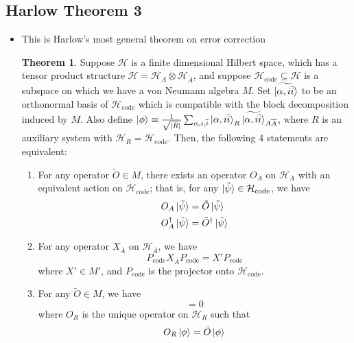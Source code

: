 \documentclass[12pt,a4paper]{article}
\numberwithin{equation}{section}
\newcommand{\Pc}{P_{\text{code}}}
\newcommand{\Hcode}{\mathcal{H}_{\text{code}}}
\newcommand{\ol}[1]{\overline{#1}}
\theoremstyle{definition}
\theoremstyle{theorem}
\newtheorem{theorem}{Theorem}[section]
\theoremstyle{example}
\begin{document}
	\subsection{Harlow Theorem 3}
	\begin{itemize}
		\item This is Harlow's most general theorem on error correction
		\begin{theorem}
			Suppose $\mathcal{H}$ is a finite dimensional Hilbert space, which has a tensor product structure $\mathcal{H}=\mathcal{H}_{A}\otimes\mathcal{H}_{\ol{A}}$, and suppose $\Hcode\subseteq\mathcal{H}$ is a subspace on which we have a von Neumann algebra $M$. Set $\ket{\widetilde{\alpha,i\ol{i}}}$ to be an orthonormal basis of $\Hcode$ which is compatible with the block decomposition induced by $M$. Also define $\ket{\phi}\equiv\frac{1}{\sqrt{|R|}}\sum_{\alpha,i,\ol{i}}\ket{\alpha,i\ol{i}}_{R}\ket{\widetilde{\alpha, i\ol{i}}}_{A\ol{A}}$, where $R$ is an auxiliary system with $\mathcal{H}_{R}=\Hcode$. Then, the following 4 statements are equivalent:
			\begin{enumerate}
				\item For any operator $\tilde{O}\in M$, there exists an operator $O_{A}$ on $\mathcal{H}_{A}$ with an equivalent action on $\Hcode$; that is, for any $\ket{\tilde{\psi}}\in\Hcode$, we have
				\begin{equation}
					\begin{aligned}
						O_{A}\ket{\tilde{\psi}}&=\tilde{O}\ket{\tilde{\psi}}\\
						O_{A}^{\dagger}\ket{\tilde{\psi}}&=\tilde{O}^{\dagger}\ket{\tilde{\psi}}
					\end{aligned}
				\end{equation}
				\item For any operator $X_{\ol{A}}$ on $\mathcal{H}_{\ol{A}}$, we have
				\begin{equation}
					\Pc X_{\ol{A}}\Pc=X'\Pc
				\end{equation}
				where $X'\in M'$, and $\Pc$ is the projector onto $\Hcode$.
				\item For any $\tilde{O}\in M$, we have
				\begin{equation}
					[O_{R},\rho_{R\ol{A}}(\phi)]=0
				\end{equation}
				where $O_{R}$ is the unique operator on $\mathcal{H}_{R}$ such that
				\begin{equation}
					\begin{aligned}
						O_{R}\ket{\phi}&=\tilde{O}\ket{\phi}\\

\end{aligned}
\end{equation}
\end{enumerate}
\end{theorem}
\end{itemize}
\end{document}
